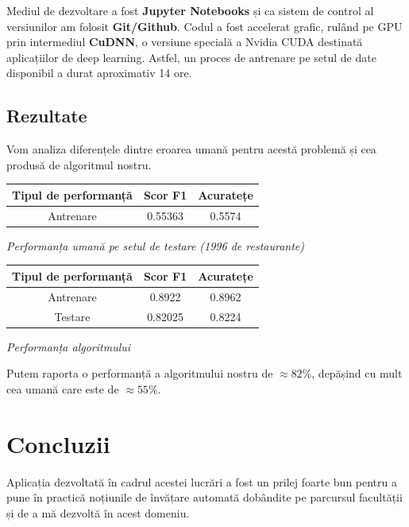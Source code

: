 Mediul de dezvoltare a fost \textbf{Jupyter Notebooks} și ca sistem de control al versiunilor am folosit \textbf{Git/Github}. Codul a fost accelerat grafic, rulând pe GPU prin intermediul \textbf{CuDNN}, o versiune specială a Nvidia CUDA destinată aplicațiilor de deep learning. Astfel, un proces de antrenare pe setul de date disponibil a durat aproximativ 14 ore.

\subsection{Rezultate}
Vom analiza diferențele dintre eroarea umană pentru acestă problemă și cea produsă de algoritmul nostru.

\begin{center}
\begin{tabular}{|c|c|c|}
\hline Tipul de performanță & Scor F1 & Acuratețe \\
\hline Antrenare & 0.55363 & 0.5574 \\
\hline
\end{tabular}
\end{center}

\begin{center}
\textit{Performanța umană pe setul de testare (1996 de restaurante)}
\end{center}

\begin{center}
\begin{tabular}{|c|c|c|}
\hline Tipul de performanță & Scor F1 & Acuratețe \\
\hline Antrenare & 0.8922 & 0.8962 \\
\hline Testare & 0.82025 & 0.8224  \\
\hline
\end{tabular}
\end{center}

\begin{center}
\textit{Performanța algoritmului}
\end{center}

Putem raporta o performanță a algoritmului nostru de $\approx 82\%$, depășind cu mult cea umană care este de $\approx 55\%$.

\pagebreak

\section{Concluzii}
Aplicația dezvoltată în cadrul acestei lucrări a fost un prilej foarte bun pentru a pune în practică noțiunile de învățare automată dobândite pe parcursul facultății și de a mă dezvoltă în acest domeniu. \\


